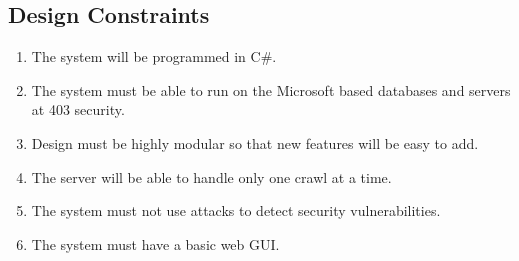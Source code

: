 \subsection{Design Constraints}
\begin{enumerate}
\item The system will be programmed in C\#.
\item The system must be able to run on the Microsoft based databases and servers at 403 security.
\item Design must be highly modular so that new features will be easy to add.
\item The server will be able to handle only one crawl at a time.
\item The system must not use attacks to detect security vulnerabilities.
\item The system must have a basic web GUI.
\end{enumerate}

